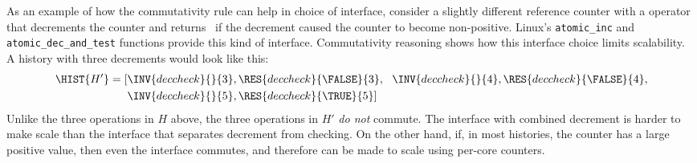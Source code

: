 As an example of how the commutativity rule can help in choice
of interface, consider a slightly different reference counter
with a  operator that decrements the counter
and returns
\TRUE\ if the decrement caused the counter to become non-positive.
%
Linux's \verb+atomic_inc+ and \verb+atomic_dec_and_test+
functions provide this kind of interface.
%
Commutativity reasoning shows how this interface choice limits
scalability.
%
A history with three decrements would look like this:
%
\begin{align*}
\HIST{H'} = [&\INV{deccheck}{}{3}, \RES{deccheck}{\FALSE}{3}, ~~
	     \INV{deccheck}{}{4}, \RES{deccheck}{\FALSE}{4}, \\
             &\INV{deccheck}{}{5}, \RES{deccheck}{\TRUE}{5}]
\end{align*}
%
Unlike the three  operations in $H$ above, the three
 operations in $H'$ \emph{do not}
commute.
%
The interface with combined decrement is harder to make scale than
the interface that separates decrement from checking.
%
On the other hand, if, in most histories, the counter has a large
positive value, then even the  interface commutes, and
therefore can be made to scale using per-core counters.





